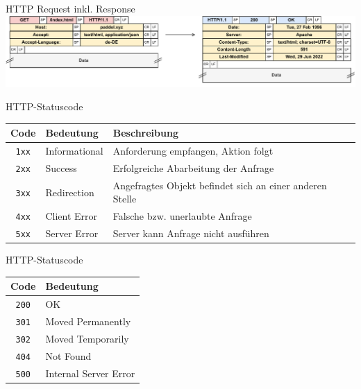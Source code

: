 \begin{example}{HTTP Request inkl. Response}
    \includegraphics[width=\textwidth]{includes/figures/example_http_header.pdf}
\end{example}

\begin{bonus}{HTTP-Statuscode}
    \begin{center}
        \begin{tabular}{|c|l|l|}
            \hline
            Code         & Bedeutung     & Beschreibung                                             \\\hline\hline
            \texttt{1xx} & Informational & Anforderung empfangen, Aktion folgt                      \\\hline
            \texttt{2xx} & Success       & Erfolgreiche Abarbeitung der Anfrage                     \\\hline
            \texttt{3xx} & Redirection   & Angefragtes Objekt befindet sich an einer anderen Stelle \\\hline
            \texttt{4xx} & Client Error  & Falsche bzw. unerlaubte Anfrage                          \\\hline
            \texttt{5xx} & Server Error  & Server kann Anfrage nicht ausführen                      \\\hline
        \end{tabular}
    \end{center}
\end{bonus}

\begin{example}{HTTP-Statuscode}
    \begin{center}
        \begin{tabular}{|c|l|}
            \hline
            Code         & Bedeutung             \\\hline\hline
            \texttt{200} & OK                    \\\hline
            \texttt{301} & Moved Permanently     \\\hline
            \texttt{302} & Moved Temporarily     \\\hline
            \texttt{404} & Not Found             \\\hline
            \texttt{500} & Internal Server Error \\\hline
        \end{tabular}
    \end{center}
\end{example}

